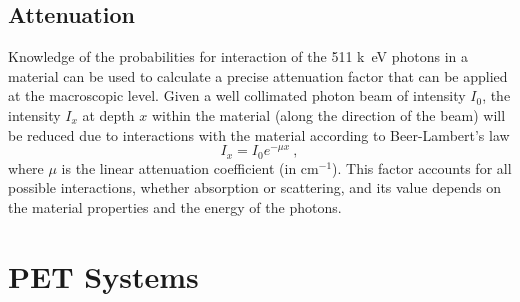 \subsection{Attenuation}
Knowledge of the probabilities for interaction of the 511 \si{k\electronvolt} photons in a material can be used to calculate a precise attenuation factor that can be applied at the macroscopic level. Given a well collimated photon beam of intensity $I_0$, the intensity $I_x$ at depth $x$ within the material (along the direction of the beam) will be reduced due to interactions with the material according to Beer-Lambert's law
\begin{equation} \label{Attenuation}
I_x = I_0 e^{-\mu x} \ ,
\end{equation}
where $\mu$ is the linear attenuation coefficient (in cm$^{-1}$). This factor accounts for all possible interactions, whether absorption or scattering, and its value depends on the material properties and the energy of the photons.
%
%
%
\section{PET Systems}

